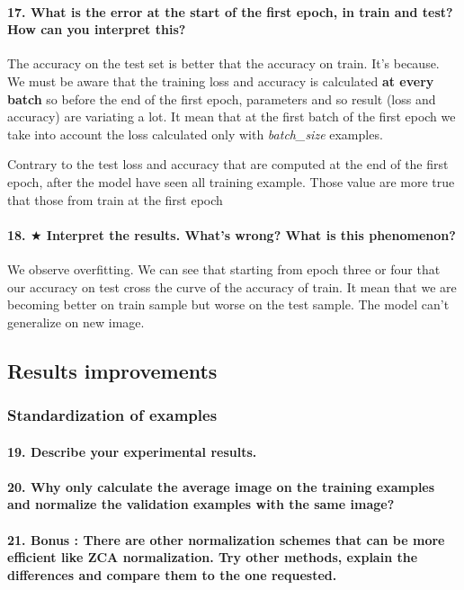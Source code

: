 \documentclass{article}
\theoremstyle{plain}%
\theoremstyle{definition}
\theoremstyle{remark}
\begin{document}
\paragraph{17. What is the error at the start of the first epoch, in train and test? How can you interpret this?}
The accuracy on the test set is better that the accuracy on train. It's because. 
We must be aware that the training loss and accuracy is calculated \textbf{at every batch} so before the end of the first epoch, parameters and so result (loss and accuracy) are variating a lot. It mean that at the first batch of the first epoch we take into account the loss calculated only with \textit{batch\_size} examples.

Contrary to the test loss and accuracy that are computed at the end of the first epoch, after the model have seen all training example. Those value are more true that those from train at the first epoch %

\paragraph{18. $ \bigstar $ Interpret the results. What's wrong? What is this phenomenon?}
We observe overfitting. We can see that starting from epoch three or four that our accuracy on test cross the curve of the accuracy of train. It mean that we are becoming better on train sample but worse on the test sample. The model can't generalize on new image.


\subsection{Results improvements}
\subsubsection{Standardization of examples}
\paragraph{19. Describe your experimental results.}

\paragraph{20. Why only calculate the average image on the training examples and normalize the validation examples with the same image?}

\paragraph{21. Bonus : There are other normalization schemes that can be more efficient like ZCA normalization. Try other methods, explain the differences and compare them to the one requested.}
\end{document}
